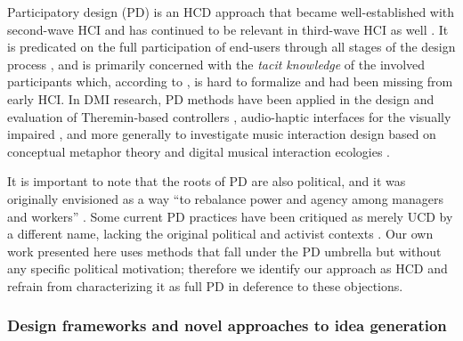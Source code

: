 \documentclass[letterpaper, 12pt]{article}
\begin{document}
Participatory design (PD) is an HCD approach that became well-established with second-wave HCI \citep{Bodker2015} and has continued to be relevant in third-wave HCI as well \citep{Muller2012}. It is predicated on the full participation of end-users through all stages of the design process \citep{Steen2011}, and is primarily concerned with the \emph{tacit knowledge} of the involved participants which, according to \citet{Spinuzzi2005}, is hard to formalize and had been missing from early HCI. In DMI research, PD methods have been applied in the design and evaluation of Theremin-based controllers \citep{Geiger2008}, audio-haptic interfaces for the visually impaired \citep{Metatla2016}, and more generally to investigate music interaction design based on conceptual metaphor theory \citep{wilkie2013towards} and digital musical interaction ecologies \citep{Fyans:2012}.

It is important to note that the roots of PD are also political, and it was originally envisioned as a way ``to rebalance power and agency among managers and workers'' \citep[p. 1]{Bannon2018}. Some current PD practices have been critiqued as merely UCD by a different name, lacking the original political and activist contexts \citep{Bannon2018}. Our own work presented here uses methods that fall under the PD umbrella but without any specific political motivation; therefore we identify our approach as HCD and refrain from characterizing it as full PD in deference to these objections.




\subsubsection{Design frameworks and novel approaches to idea generation}
\label{ch3-sec:design-frameworks}
\end{document}
